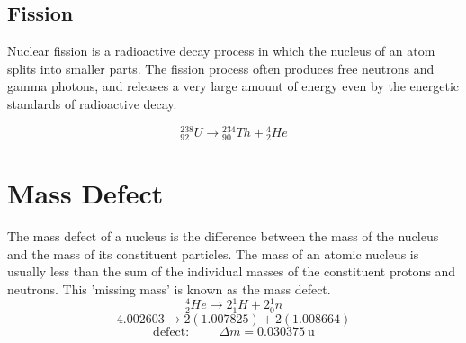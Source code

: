 \subsection{Fission}
Nuclear fission is a radioactive decay process in which the nucleus of an atom splits into smaller parts. The fission process often produces free neutrons and gamma photons, and releases a very large amount of energy even by the energetic standards of radioactive decay.

$${}_{92}^{238}U \longrightarrow {}_{90}^{234}Th +{}_{2}^{4}He$$
\section{Mass Defect}
The mass defect of a nucleus is the difference between the mass of the nucleus and the mass of its constituent particles.  The mass of an atomic nucleus is usually less than the sum of the individual masses of the constituent protons and neutrons. This 'missing mass' is known as the mass defect. 
$${}_{2}^{4}He \longrightarrow 2{}_{1}^{1}H + 2{}_{0}^{1}n$$
$$4.002603 \longrightarrow 2(1.007825) + 2(1.008664)$$
$$\text{defect:}\hspace{1cm}\Delta m = 0.030375\ \text{u}$$

